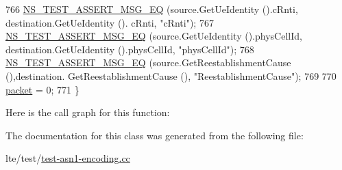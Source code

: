 \begin{DoxyCode}
766   \hyperlink{group__testing_ga2a9d78cffb3db8e867c35fff0b698cf5}{NS\_TEST\_ASSERT\_MSG\_EQ} (source.GetUeIdentity ().cRnti, destination.GetUeIdentity ().
      cRnti, \textcolor{stringliteral}{"cRnti"});
767   \hyperlink{group__testing_ga2a9d78cffb3db8e867c35fff0b698cf5}{NS\_TEST\_ASSERT\_MSG\_EQ} (source.GetUeIdentity ().physCellId, destination.GetUeIdentity
       ().physCellId, \textcolor{stringliteral}{"physCellId"});
768   \hyperlink{group__testing_ga2a9d78cffb3db8e867c35fff0b698cf5}{NS\_TEST\_ASSERT\_MSG\_EQ} (source.GetReestablishmentCause (),destination.
      GetReestablishmentCause (), \textcolor{stringliteral}{"ReestablishmentCause"});
769 
770   \hyperlink{classRrcHeaderTestCase_a6f0748c0e845f797497fbda1ca781803}{packet} = 0;
771 \}
\end{DoxyCode}


Here is the call graph for this function\+:




The documentation for this class was generated from the following file\+:\begin{DoxyCompactItemize}
\item 
lte/test/\hyperlink{test-asn1-encoding_8cc}{test-\/asn1-\/encoding.\+cc}\end{DoxyCompactItemize}
